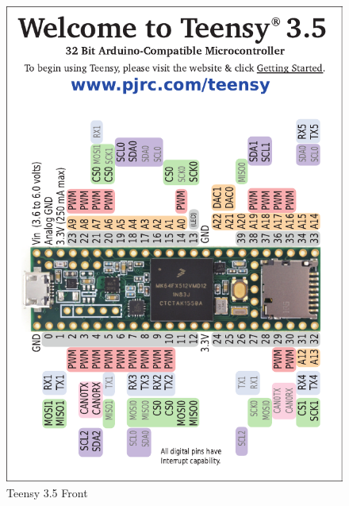 \documentclass{article}
\begin{document}
\begin{figure}[H]
    \centering
    \includegraphics[width=\textwidth]{images/card8a_rev2.pdf}
    \caption{Teensy 3.5 Front}
    \label{fig:teensy-front}
\end{figure}
\end{document}
